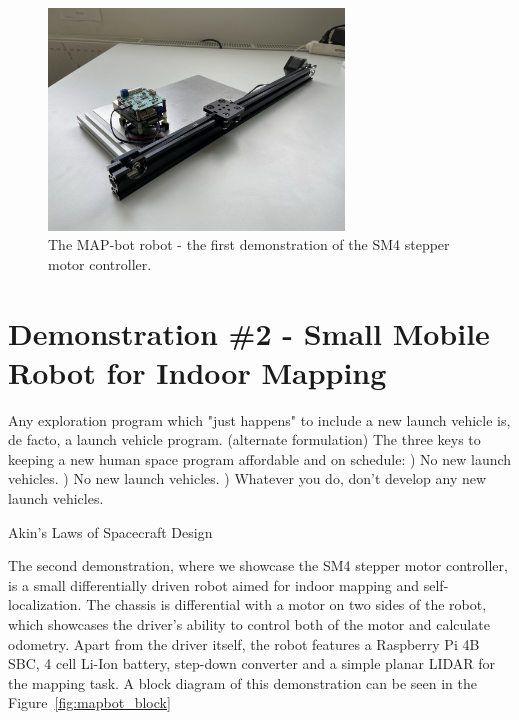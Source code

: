 \begin{figure}[H]
    \centering
    \includegraphics[width=0.7\textwidth]{obrazky/rail}
    \caption{The MAP-bot robot - the first demonstration of the SM4 stepper motor controller.}
    \label{fig:rail_demonstrator}
\end{figure}

\section{Demonstration \#2 - Small Mobile Robot for Indoor Mapping}
\label{sec:dem1}
\epigraph{
    Any exploration program which "just happens" to include a new launch vehicle is, de facto, a launch vehicle program. \newline\newline
    (alternate formulation) The three keys to keeping a new human space program affordable and on schedule: )  No new launch vehicles. )  No new launch vehicles. )  Whatever you do, don't develop any new launch vehicles.}{Akin's Laws of Spacecraft Design\cite{akin_akins_nodate}}

The second demonstration, where we showcase the SM4 stepper motor controller, is a small differentially driven robot aimed for indoor mapping and self-localization.
The chassis is differential with a motor on two sides of the robot, which showcases the driver's ability to control both of the motor and calculate odometry.
Apart from the driver itself, the robot features a Raspberry Pi 4B SBC, 4 cell Li-Ion battery, step-down converter and a simple planar LIDAR for the mapping task.
A block diagram of this demonstration can be seen in the Figure~\ref{fig:mapbot_block}

